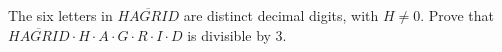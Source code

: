 The six letters in $\overline{HAGRID}$ are distinct decimal digits, with $H\ne0$. Prove that $\overline{HAGRID}\cdot H\cdot A\cdot G\cdot R\cdot I\cdot D$ is divisible by 3.
